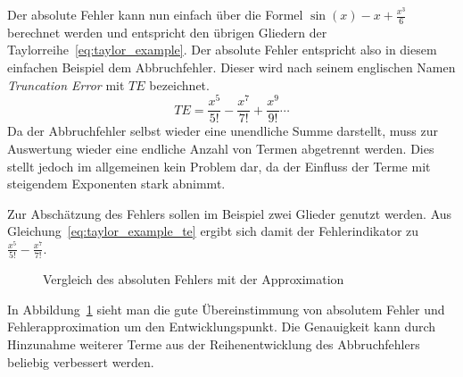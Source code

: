 Der absolute Fehler kann nun einfach über die Formel $\sin(x) - x + \frac{x^3}{6}$
berechnet werden und entspricht den übrigen Gliedern der Taylorreihe~\ref{eq:taylor_example}.
Der absolute Fehler entspricht also in diesem einfachen Beispiel dem Abbruchfehler.
Dieser wird nach seinem englischen Namen \textit{Truncation Error} mit $TE$ bezeichnet.
\begin{equation}
  TE = \frac{x^5}{5!} -\frac{x^7}{7!} +\frac{x^9}{9!}\cdots
 \label{eq:taylor_example_te}
\end{equation}
Da der Abbruchfehler selbst wieder eine unendliche Summe darstellt, muss zur Auswertung
wieder eine endliche Anzahl von Termen abgetrennt werden. Dies stellt jedoch im allgemeinen
kein Problem dar, da der Einfluss der Terme mit steigendem Exponenten stark abnimmt.

Zur Abschätzung des Fehlers sollen im Beispiel zwei Glieder genutzt werden. Aus
Gleichung~\ref{eq:taylor_example_te} ergibt sich damit der Fehlerindikator zu
$\frac{x^5}{5!} -\frac{x^7}{7!} $.
\begin{figure}[h]
\centering
\caption{Vergleich des absoluten Fehlers mit der Approximation}
 \label{fig:taylor_example_te}
\end{figure}
In Abbildung~\ref{fig:taylor_example_te} sieht man die gute Übereinstimmung von absolutem Fehler und Fehlerapproximation um den Entwicklungspunkt. Die Genauigkeit kann durch Hinzunahme weiterer Terme aus der Reihenentwicklung des Abbruchfehlers beliebig verbessert werden.
